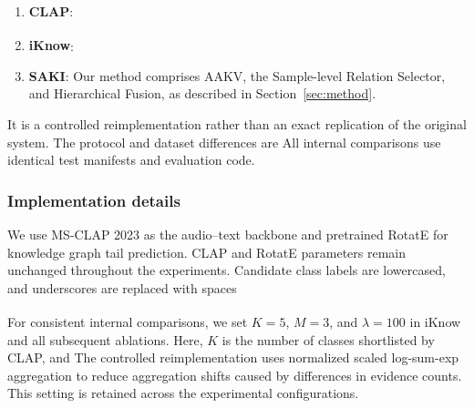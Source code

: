 
\begin{enumerate}
    \item \textbf{CLAP}: 
    \item \textbf{iKnow\textsuperscript{\dag}}: 
    \item \textbf{SAKI}: Our method comprises AAKV, the Sample-level Relation Selector, and Hierarchical Fusion, as described in Section~\ref{sec:method}.
\end{enumerate}

 It is a controlled reimplementation rather than an exact replication of the original system. The protocol and dataset differences are  All internal comparisons use identical test manifests and evaluation code.

\subsubsection{Implementation details}\label{sec:implementation-details}

We use MS-CLAP 2023 as the audio--text backbone and pretrained RotatE for knowledge graph tail prediction. CLAP and RotatE parameters remain unchanged throughout the experiments. Candidate class labels are lowercased, and underscores are replaced with spaces 

For consistent internal comparisons, we set $K=5$, $M=3$, and $\lambda=100$ in iKnow\textsuperscript{\dag} and all subsequent ablations. Here, $K$ is the number of classes shortlisted by CLAP, and  The controlled reimplementation uses normalized scaled log-sum-exp aggregation to reduce aggregation shifts caused by differences in evidence counts. This setting is retained across the experimental configurations.


